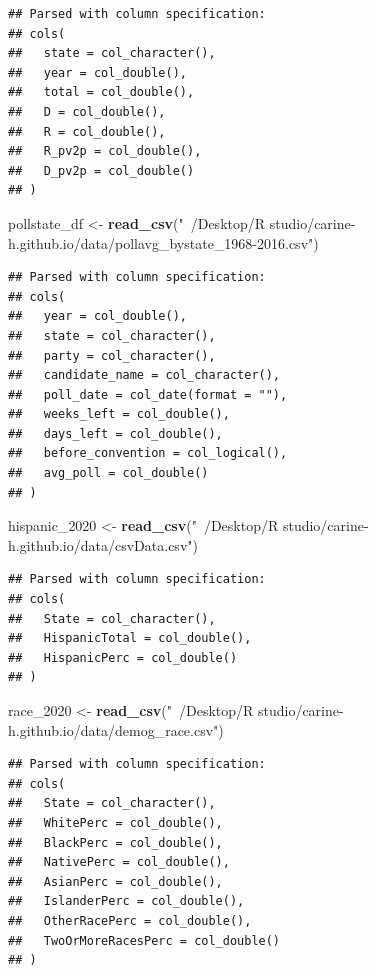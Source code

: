 \documentclass[
]{article}
\newenvironment{Shaded}{\begin{snugshade}}{\end{snugshade}}
\newcommand{\DecValTok}[1]{\textcolor[rgb]{0.00,0.00,0.81}{#1}}
\newcommand{\KeywordTok}[1]{\textcolor[rgb]{0.13,0.29,0.53}{\textbf{#1}}}
\newcommand{\NormalTok}[1]{#1}
\newcommand{\StringTok}[1]{\textcolor[rgb]{0.31,0.60,0.02}{#1}}
\begin{document}
\begin{verbatim}
## Parsed with column specification:
## cols(
##   state = col_character(),
##   year = col_double(),
##   total = col_double(),
##   D = col_double(),
##   R = col_double(),
##   R_pv2p = col_double(),
##   D_pv2p = col_double()
## )
\end{verbatim}

\begin{Shaded}
\begin{Highlighting}[]
\NormalTok{pollstate_df  <-}\StringTok{ }\KeywordTok{read_csv}\NormalTok{(}\StringTok{"~/Desktop/R studio/carine-h.github.io/data/pollavg_bystate_1968-2016.csv"}\NormalTok{)}
\end{Highlighting}
\end{Shaded}

\begin{verbatim}
## Parsed with column specification:
## cols(
##   year = col_double(),
##   state = col_character(),
##   party = col_character(),
##   candidate_name = col_character(),
##   poll_date = col_date(format = ""),
##   weeks_left = col_double(),
##   days_left = col_double(),
##   before_convention = col_logical(),
##   avg_poll = col_double()
## )
\end{verbatim}

\begin{Shaded}
\begin{Highlighting}[]
\NormalTok{hispanic_}\DecValTok{2020}\NormalTok{ <-}\StringTok{ }\KeywordTok{read_csv}\NormalTok{(}\StringTok{"~/Desktop/R studio/carine-h.github.io/data/csvData.csv"}\NormalTok{)}
\end{Highlighting}
\end{Shaded}

\begin{verbatim}
## Parsed with column specification:
## cols(
##   State = col_character(),
##   HispanicTotal = col_double(),
##   HispanicPerc = col_double()
## )
\end{verbatim}

\begin{Shaded}
\begin{Highlighting}[]
\NormalTok{race_}\DecValTok{2020}\NormalTok{ <-}\StringTok{ }\KeywordTok{read_csv}\NormalTok{(}\StringTok{"~/Desktop/R studio/carine-h.github.io/data/demog_race.csv"}\NormalTok{)}
\end{Highlighting}
\end{Shaded}

\begin{verbatim}
## Parsed with column specification:
## cols(
##   State = col_character(),
##   WhitePerc = col_double(),
##   BlackPerc = col_double(),
##   NativePerc = col_double(),
##   AsianPerc = col_double(),
##   IslanderPerc = col_double(),
##   OtherRacePerc = col_double(),
##   TwoOrMoreRacesPerc = col_double()
## )
\end{verbatim}
\end{document}
